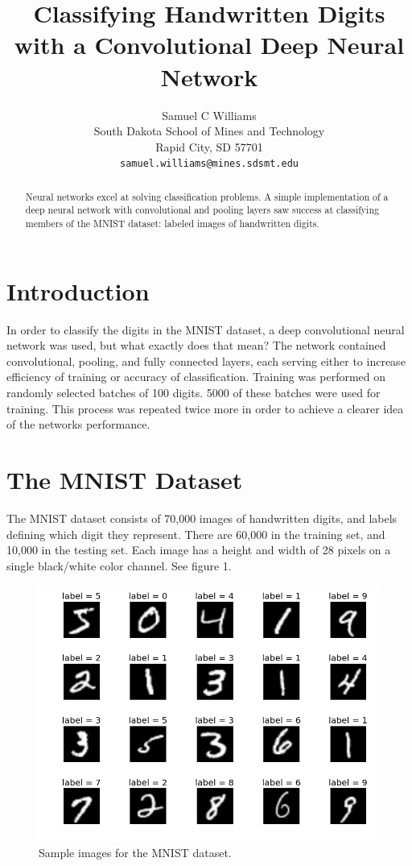 \documentclass{article}
\title{Classifying Handwritten Digits with a Convolutional Deep Neural Network}
\author{
  Samuel C Williams\\
  South Dakota School of Mines and Technology\\
  Rapid City, SD 57701 \\
  \texttt{samuel.williams@mines.sdsmt.edu} \\
}
\begin{document}

\maketitle

\begin{abstract}
  Neural networks excel at solving classification problems. A simple implementation of a deep neural network with convolutional and pooling layers saw success at classifying members of the MNIST dataset: labeled images of handwritten digits.
\end{abstract}

\section{Introduction}

In order to classify the digits in the MNIST dataset, a deep convolutional neural network was used, but what exactly does that mean? The network contained convolutional, pooling, and fully connected layers, each serving either to increase efficiency of training or accuracy of classification. Training was performed on randomly selected batches of 100 digits. 5000 of these batches were used for training. This process was repeated twice more in order to achieve a clearer idea of the networks performance.

\section{The MNIST Dataset}

The MNIST dataset consists of 70,000 images of handwritten digits, and labels defining which digit they represent. There are 60,000 in the training set, and 10,000 in the testing set. Each image has a height and width of 28 pixels on a single black/white color channel. See figure 1.

\begin{figure}
  \centering
  	\includegraphics[width=0.8\linewidth]{figures/mnist_example}
  \caption{Sample images for the MNIST dataset.}
\end{figure}
\end{document}
